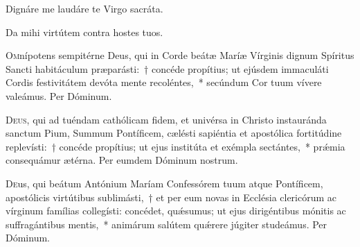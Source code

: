 \documentclass[vesperale_romanum.tex]{subfiles}
\begin{document}
 


\vv Dignáre me laudáre te Virgo sacráta. %

\rr Da mihi virtútem contra hostes tuos.


\oratio
\lettrine{O}{m}nípotens sempitérne Deus, qui in Corde beátæ Maríæ Vírginis dignum Spíritus Sancti habitáculum præparásti:~† concéde propítius; ut ejúsdem immaculáti Cordis festivitátem devóta mente recoléntes,~* secúndum Cor tuum vívere valeámus. Per Dóminum.






\duplexmtv

\oratio
\lettrine{D}{eus}, qui ad tuéndam cathólicam fidem, et univérsa in Christo instauránda sanctum Pium, Summum Pontíficem, cælésti sapiéntia et apostólica fortitúdine replevísti:~† concéde propítius; ut ejus institúta et exémpla se\-ctántes,~* prǽmia consequámur ætérna.
Per eumdem Dóminum nostrum.

 

 
\oratio
\lettrine{D}{e}us,  qui beátum Antónium Maríam Confessórem tuum atque Pontíficem, apostólicis virtútibus sublimásti,~† et per eum novas in Ecclésia clericórum ac vírginum famílias collegísti: concédet, quǽsumus; ut ejus dirigéntibus mónitis ac suffragántibus mentis,~* animárum salútem quǽrere júgiter studeámus.
Per Dóminum.
\end{document}
